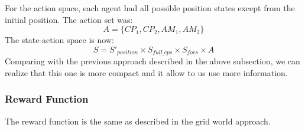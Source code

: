 \documentclass[conference]{IEEEtran}
\begin{document}
For the action space, each agent had all possible position states except from the initial position.
The action set was:
\begin{equation}
A = \lbrace CP_1, CP_2, AM_1, AM_2 \rbrace
\end{equation}
The state-action space is now:
\begin{equation}
S = S'_{position} \times S_{full\_cps} \times S_{foes} \times A
\end{equation}
Comparing with the previous approach described in the above subsection, we can realize that this one is more compact and it allow to us use more information.
\subsubsection{Reward Function}
The reward function is the same as described in the grid world approach.
\end{document}
